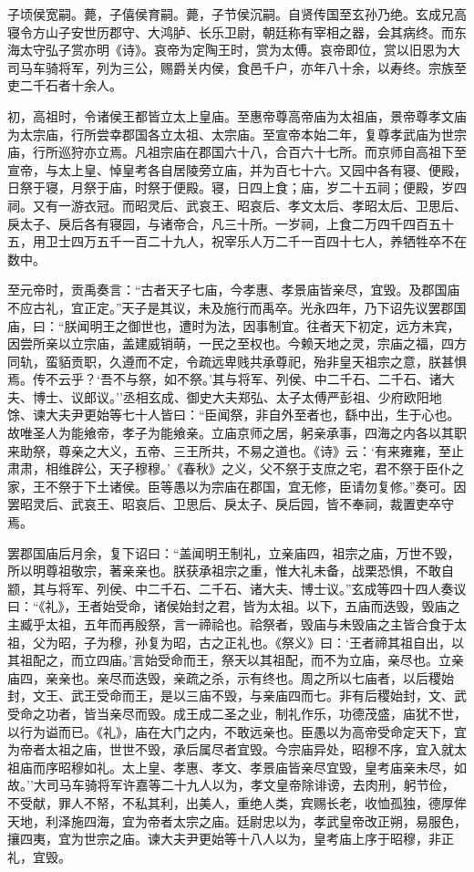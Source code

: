 \documentclass[]{article}
\begin{document}
子顷侯宽嗣。薨，子僖侯育嗣。薨，子节侯沉嗣。自贤传国至玄孙乃绝。玄成兄高寝令方山子安世历郡守、大鸿胪、长乐卫尉，朝廷称有宰相之器，会其病终。而东海太守弘子赏亦明《诗》。哀帝为定陶王时，赏为太傅。哀帝即位，赏以旧恩为大司马车骑将军，列为三公，赐爵关内侯，食邑千户，亦年八十余，以寿终。宗族至吏二千石者十余人。

初，高祖时，令诸侯王都皆立太上皇庙。至惠帝尊高帝庙为太祖庙，景帝尊孝文庙为太宗庙，行所尝幸郡国各立太祖、太宗庙。至宣帝本始二年，复尊孝武庙为世宗庙，行所巡狩亦立焉。凡祖宗庙在郡国六十八，合百六十七所。而京师自高祖下至宣帝，与太上皇、悼皇考各自居陵旁立庙，并为百七十六。又园中各有寝、便殿，日祭于寝，月祭于庙，时祭于便殿。寝，日四上食；庙，岁二十五祠；便殿，岁四祠。又有一游衣冠。而昭灵后、武哀王、昭哀后、孝文太后、孝昭太后、卫思后、戾太子、戾后各有寝园，与诸帝合，凡三十所。一岁祠，上食二万四千四百五十五，用卫士四万五千一百二十九人，祝宰乐人万二千一百四十七人，养牺牲卒不在数中。

至元帝时，贡禹奏言：``古者天子七庙，今孝惠、孝景庙皆亲尽，宜毁。及郡国庙不应古礼，宜正定。''天子是其议，未及施行而禹卒。光永四年，乃下诏先议罢郡国庙，曰：``朕闻明王之御世也，遭时为法，因事制宜。往者天下初定，远方未宾，因尝所亲以立宗庙，盖建威销萌，一民之至权也。今赖天地之灵，宗庙之福，四方同轨，蛮貊贡职，久遵而不定，令疏远卑贱共承尊祀，殆非皇天祖宗之意，朕甚惧焉。传不云乎？`吾不与祭，如不祭。'其与将军、列侯、中二千石、二千石、诸大夫、博士、议郎议。''丞相玄成、御史大夫郑弘、太子太傅严彭祖、少府欧阳地馀、谏大夫尹更始等七十人皆曰：``臣闻祭，非自外至者也，繇中出，生于心也。故唯圣人为能飨帝，孝子为能飨亲。立庙京师之居，躬亲承事，四海之内各以其职来助祭，尊亲之大义，五帝、三王所共，不易之道也。《诗》云：`有来雍雍，至止肃肃，相维辟公，天子穆穆。'《春秋》之义，父不祭于支庶之宅，君不祭于臣仆之家，王不祭于下土诸侯。臣等愚以为宗庙在郡国，宜无修，臣请勿复修。''奏可。因罢昭灵后、武哀王、昭哀后、卫思后、戾太子、戾后园，皆不奉祠，裁置吏卒守焉。

罢郡国庙后月余，复下诏曰：``盖闻明王制礼，立亲庙四，祖宗之庙，万世不毁，所以明尊祖敬宗，著亲亲也。朕获承祖宗之重，惟大礼未备，战栗恐惧，不敢自颛，其与将军、列侯、中二千石、二千石、诸大夫、博士议。''玄成等四十四人奏议曰：``《礼》，王者始受命，诸侯始封之君，皆为太祖。以下，五庙而迭毁，毁庙之主臧乎太祖，五年而再殷祭，言一禘祫也。祫祭者，毁庙与未毁庙之主皆合食于太祖，父为昭，子为穆，孙复为昭，古之正礼也。《祭义》曰：`王者禘其祖自出，以其祖配之，而立四庙。'言始受命而王，祭天以其祖配，而不为立庙，亲尽也。立亲庙四，亲亲也。亲尽而迭毁，亲疏之杀，示有终也。周之所以七庙者，以后稷始封，文王、武王受命而王，是以三庙不毁，与亲庙四而七。非有后稷始封，文、武受命之功者，皆当亲尽而毁。成王成二圣之业，制礼作乐，功德茂盛，庙犹不世，以行为谥而已。《礼》，庙在大门之内，不敢远亲也。臣愚以为高帝受命定天下，宜为帝者太祖之庙，世世不毁，承后属尽者宜毁。今宗庙异处，昭穆不序，宜入就太祖庙而序昭穆如礼。太上皇、孝惠、孝文、孝景庙皆亲尽宜毁，皇考庙亲未尽，如故。''大司马车骑将军许嘉等二十九人以为，孝文皇帝除诽谤，去肉刑，躬节俭，不受献，罪人不帑，不私其利，出美人，重绝人类，宾赐长老，收恤孤独，德厚侔天地，利泽施四海，宜为帝者太宗之庙。廷尉忠以为，孝武皇帝改正朔，易服色，攘四夷，宜为世宗之庙。谏大夫尹更始等十八人以为，皇考庙上序于昭穆，非正礼，宜毁。
\end{document}
